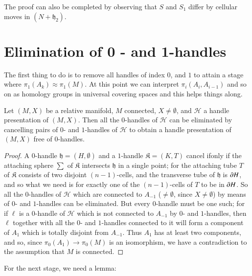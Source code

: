 \begin{rem}%
The proof can also be completed by observing that $S$ and $S_{1}$ differ by cellular moves in $(N+\mathfrak{h}_{2})$.
\end{rem}

\section{Elimination of 0 - and  1-handles}\label{chap8-sec8.7}

The first thing to do is to remove all handles of index $0$, and $1$ to attain a stage where $\pi_{1}(A_{k})\approx \pi_{1}(M)$. At this point we can interpret $\pi_{i}(A_{i},A_{i-1})$ and so on as homology groups in universal covering spaces and this helps things along.

\begin{proposition}\label{chap8-prop8.7.1}
Let $(M,X)$ be a relative manifold, $M$ connected, $X\neq \emptyset$, and $\mathscr{H}$ a handle presentation of $(M,X)$. Then all the $0$-handles of $\mathscr{H}$ can be eliminated by cancelling pairs of $0$- and $1$-handles of $\mathscr{H}$ to obtain a handle presentation of $(M,X)$ free of $0$-handles.
\end{proposition}

\begin{proof}
A $0$-handle $\mathfrak{h}=(H,\emptyset)$ and a $1$-handle $\mathfrak{K}=(K,T)$ cancel if\pageoriginale only if the attaching sphere $\sum$ of $\mathfrak{K}$ intersects $\mathfrak{h}$ in a single point; for the attaching tube $T$ of $\mathfrak{K}$ consists of two disjoint $(n-1)$-cells, and the transverse tube of $\mathfrak{h}$ is $\partial H$, and so what we need is for exactly one of the $(n-1)$-cells of $T$ to be in $\partial H$. So all the $0$-handles of $\mathscr{H}$ which are connected to $A_{-1}$ ($\neq \emptyset$, since $X\neq \emptyset$) by means of $0$- and $1$-handles can be eliminated. But every $0$-handle must be one such; for if
$\ell$ is a $0$-handle of $\mathscr{H}$ which is not connected to $A_{-1}$ by $0$- and $1$-handles, then $\ell$ together with all the $0$- and $1$-handles connected to it will form a component of $A_{1}$ which is totally disjoint from $A_{-1}$. Thus $A_{1}$ has at least two components, and so, since $\pi_{0}(A_{1})\to \pi_{0}(M)$ is an isomorphism, we have a contradiction to the assumption that $M$ is connected.
\end{proof}

For the next stage, we need a lemma:

